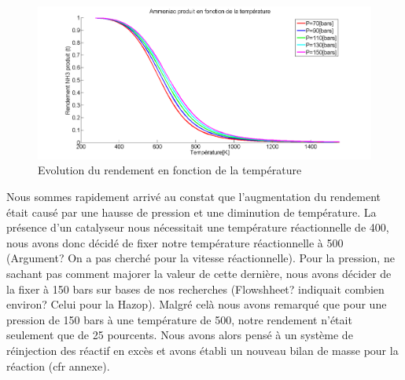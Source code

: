 \begin{figure}[ht!]
 \centering
 \includegraphics[scale=0.2]{GrapheNH3T.png}
 \caption{Evolution du rendement en fonction de la température}
 \label{scheme2}
\end{figure}


Nous sommes rapidement arrivé au constat que l'augmentation du rendement était causé par une hausse de pression et une diminution de température. La présence d'un catalyseur nous nécessitait une température réactionnelle de \unit{400}{\celsius}, nous avons donc décidé de fixer notre température réactionnelle à \unit{500}{\celsius} (Argument? On a pas cherché pour la vitesse réactionnelle). Pour la pression, ne sachant pas comment majorer la valeur de cette dernière, nous avons décider de la fixer à 150 bars sur bases de nos recherches (Flowshheet? indiquait combien environ? Celui pour la Hazop). Malgré celà nous avons remarqué que pour une pression de 150 bars à une température de \unit{500}{\celsius}, notre rendement n'était seulement que de 25 pourcents. Nous avons alors pensé à un système de réinjection des réactif en excès et avons établi un nouveau bilan de masse pour la réaction (cfr annexe). 

